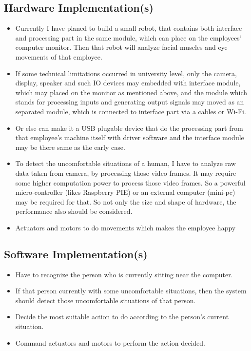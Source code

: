 \documentclass{article}
\begin{document}
	\subsection{Hardware Implementation(s)}
	\begin{itemize}
		\item Currently I have planed to build a small robot, that contains both interface and processing part in the same module, which can place on the employees' computer monitor. Then that robot will analyze facial muscles and eye movements of that employee.
		\item If some technical limitations occurred in university level, only the camera, display, speaker and such IO devices may embedded with interface module, which may placed on the monitor as mentioned above, and the module which stands for processing inputs and generating output signals may moved as an separated module, which is connected to interface part via a cables or Wi-Fi.
		\item Or else can make it a USB plugable device that do the processing part from that employee's machine itself with driver software and the interface module may be there same as the early case.
		\item To detect the uncomfortable situations of a human, I have to analyze raw data taken from camera, by processing those video frames. It may require some higher computation power to process those video frames. So a powerful micro-controller (likes Raspberry PIE) or an external computer (mini-pc) may be required for that. So not only the size and shape of hardware, the performance also should be considered.
		\item Actuators and motors to do movements which makes the employee happy
	\end{itemize}
	\subsection{Software Implementation(s)}
	\begin{itemize}
		\item Have to recognize the person who is currently sitting near the computer.
		\item If that person currently with some uncomfortable situations, then the system should detect those uncomfortable situations of that person.
		\item Decide the most suitable action to do according to the person's current situation.
		\item Command actuators and motors to perform the action decided.
	\end{itemize}
	
\end{document}
